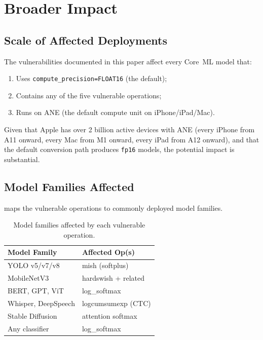 \documentclass[10pt,twocolumn]{article}
\newcommand{\fp}{\texttt{fp16}}
\newcommand{\ane}{ANE}
\newcommand{\coreml}{Core~ML}
\begin{document}
\section{Broader Impact}
\label{sec:impact}

\subsection{Scale of Affected Deployments}

The vulnerabilities documented in this paper affect every \coreml{}
model that:
\begin{enumerate}[leftmargin=*,itemsep=1pt]
  \item Uses \texttt{compute\_precision=FLOAT16} (the default);
  \item Contains any of the five vulnerable operations;
  \item Runs on \ane{} (the default compute unit on
    iPhone/iPad/Mac).
\end{enumerate}

Given that Apple has over 2 billion active devices with \ane{}
(every iPhone from A11 onward, every Mac from M1 onward, every
iPad from A12 onward), and that the default conversion path
produces \fp{} models, the potential impact is substantial.

\subsection{Model Families Affected}

 maps the vulnerable operations to
commonly deployed model families.

\begin{table}[h]
\centering
\caption{Model families affected by each vulnerable operation.}
\label{tab:model_families}
\small
\begin{tabular}{@{}ll@{}}
\toprule
\textbf{Model Family} & \textbf{Affected Op(s)} \\
\midrule
YOLO v5/v7/v8         & mish (softplus) \\
MobileNetV3           & hardswish + related \\
BERT, GPT, ViT        & log\_softmax \\
Whisper, DeepSpeech   & logcumsumexp (CTC) \\
Stable Diffusion      & attention softmax \\
Any classifier        & log\_softmax \\
\bottomrule
\end{tabular}
\end{table}
\end{document}
